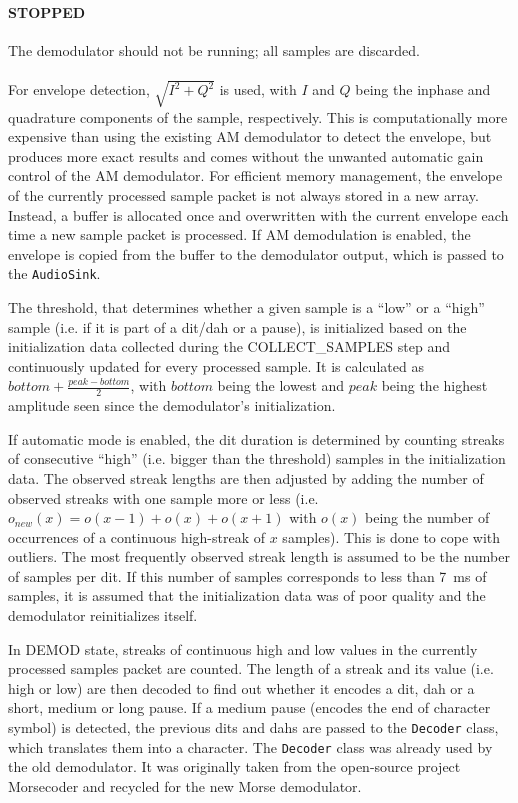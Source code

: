 \paragraph{STOPPED} The demodulator should not be running; all samples are discarded.
\paragraph{}

For envelope detection, $\sqrt{I^{2}+Q^{2}}$ is used, with $I$ and $Q$ being the inphase and quadrature components of the sample, respectively. This is computationally more expensive than using the existing \ac{AM} demodulator to detect the envelope, but produces more exact results and comes without the unwanted automatic gain control of the \ac{AM} demodulator. For efficient memory management, the envelope of the currently processed sample packet is not always stored in a new array. Instead, a buffer is allocated once and overwritten with the current envelope each time a new sample packet is processed. If \ac{AM} demodulation is enabled, the envelope is copied from the buffer to the demodulator output, which is passed to the \texttt{AudioSink}.

The threshold, that determines whether a given sample is a ``low'' or a ``high'' sample (i.e. if it is part of a dit/dah or a pause), is initialized based on the initialization data collected during the COLLECT\_{}SAMPLES step and continuously updated for every processed sample. It is calculated as $bottom + \frac{peak - bottom}{2}$, with $bottom$ being the lowest and $peak$ being the highest amplitude seen since the demodulator's initialization.

If automatic mode is enabled, the dit duration is determined by counting streaks of consecutive ``high'' (i.e. bigger than the threshold) samples in the initialization data. The observed streak lengths are then adjusted by adding the number of observed streaks with one sample more or less (i.e. $o_{new}(x) = o(x-1) + o(x)+ o(x+1)$ with $o(x)$ being the number of occurrences of a continuous high-streak of $x$ samples). This is done to cope with outliers. The most frequently observed streak length is assumed to be the number of samples per dit. If this number of samples corresponds to less than \SI{7}{\milli\second} of samples, it is assumed that the initialization data was of poor quality and the demodulator reinitializes itself.

In DEMOD state, streaks of continuous high and low values in the currently processed samples packet are counted. The length of a streak and its value (i.e. high or low) are then decoded to find out whether it encodes a dit, dah or a short, medium or long pause. If a medium pause (encodes the end of character symbol) is detected, the previous dits and dahs are passed to the \texttt{Decoder} class, which translates them into a character. The \texttt{Decoder} class was already used by the old demodulator. It was originally taken from the open-source project Morsecoder and recycled for the new Morse demodulator.

